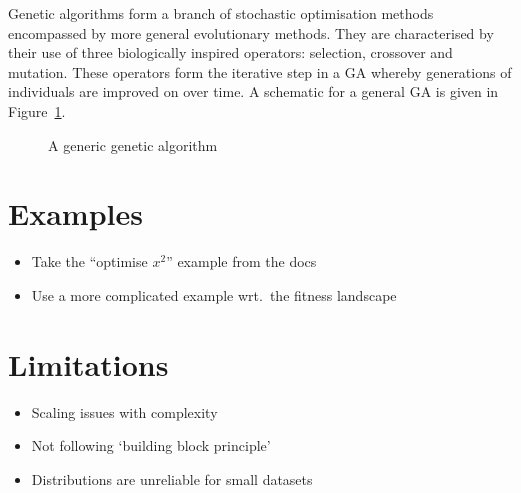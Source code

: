 \documentclass{article}
\begin{document}
Genetic algorithms form a branch of stochastic optimisation methods encompassed
by more general evolutionary methods. They are characterised by their use of
three biologically inspired operators: selection, crossover and mutation. These
operators form the iterative step in a GA whereby generations of individuals are
improved on over time. A schematic for a general GA is given in
Figure~\ref{fig:flowchart}.

\begin{figure}[htbp]
    \centering%
    \resizebox{0.6\paperwidth}{!}{%
        
    }
    \caption{A generic genetic algorithm}%
    \label{fig:flowchart}
\end{figure}



\section{Examples}

\begin{itemize}
    \item Take the ``optimise \(x^2\)'' example from the docs
    \item Use a more complicated example wrt.\ the fitness landscape
\end{itemize}

\section{Limitations}

\begin{itemize}
    \item Scaling issues with complexity
    \item Not following `building block principle'
    \item Distributions are unreliable for small datasets
\end{itemize}
\end{document}
